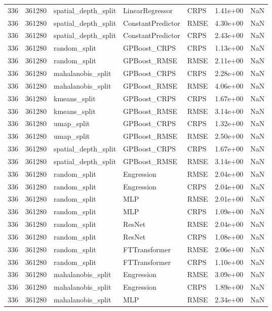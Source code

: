 \begin{tabular}{rrlllrr}
336 & 361280 & spatial\_depth\_split & LinearRegressor & CRPS & 1.41e+00 & NaN \\
336 & 361280 & spatial\_depth\_split & ConstantPredictor & RMSE & 4.30e+00 & NaN \\
336 & 361280 & spatial\_depth\_split & ConstantPredictor & CRPS & 2.43e+00 & NaN \\
336 & 361280 & random\_split & GPBoost\_CRPS & CRPS & 1.13e+00 & NaN \\
336 & 361280 & random\_split & GPBoost\_RMSE & RMSE & 2.11e+00 & NaN \\
336 & 361280 & mahalanobis\_split & GPBoost\_CRPS & CRPS & 2.28e+00 & NaN \\
336 & 361280 & mahalanobis\_split & GPBoost\_RMSE & RMSE & 4.06e+00 & NaN \\
336 & 361280 & kmeans\_split & GPBoost\_CRPS & CRPS & 1.67e+00 & NaN \\
336 & 361280 & kmeans\_split & GPBoost\_RMSE & RMSE & 3.14e+00 & NaN \\
336 & 361280 & umap\_split & GPBoost\_CRPS & CRPS & 1.32e+00 & NaN \\
336 & 361280 & umap\_split & GPBoost\_RMSE & RMSE & 2.50e+00 & NaN \\
336 & 361280 & spatial\_depth\_split & GPBoost\_CRPS & CRPS & 1.67e+00 & NaN \\
336 & 361280 & spatial\_depth\_split & GPBoost\_RMSE & RMSE & 3.14e+00 & NaN \\
336 & 361280 & random\_split & Engression & RMSE & 2.04e+00 & NaN \\
336 & 361280 & random\_split & Engression & CRPS & 2.04e+00 & NaN \\
336 & 361280 & random\_split & MLP & RMSE & 2.01e+00 & NaN \\
336 & 361280 & random\_split & MLP & CRPS & 1.09e+00 & NaN \\
336 & 361280 & random\_split & ResNet & RMSE & 2.04e+00 & NaN \\
336 & 361280 & random\_split & ResNet & CRPS & 1.08e+00 & NaN \\
336 & 361280 & random\_split & FTTransformer & RMSE & 2.06e+00 & NaN \\
336 & 361280 & random\_split & FTTransformer & CRPS & 1.10e+00 & NaN \\
336 & 361280 & mahalanobis\_split & Engression & RMSE & 3.09e+00 & NaN \\
336 & 361280 & mahalanobis\_split & Engression & CRPS & 1.89e+00 & NaN \\
336 & 361280 & mahalanobis\_split & MLP & RMSE & 2.34e+00 & NaN \\

\end{tabular}
